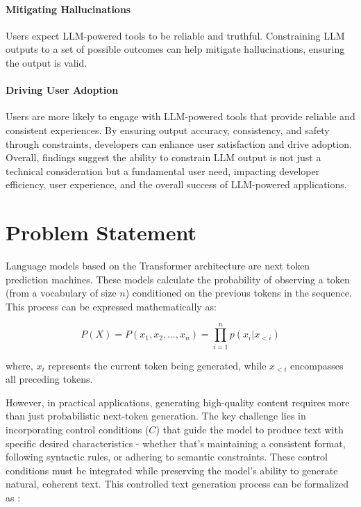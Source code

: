 \paragraph{Mitigating Hallucinations}
Users expect LLM-powered tools to be reliable and truthful. Constraining LLM outputs to a set of possible outcomes can help mitigate hallucinations, ensuring the output is valid.

\paragraph{Driving User Adoption}
Users are more likely to engage with LLM-powered tools that provide reliable and consistent experiences. By ensuring output accuracy, consistency, and safety through constraints, developers can enhance user satisfaction and drive adoption.
Overall, findings suggest the ability to constrain LLM output is not just a technical consideration but a fundamental user need, impacting developer efficiency, user experience, and the overall success of LLM-powered applications.

\section{Problem Statement}

Language models based on the Transformer architecture are next token prediction machines.
These models calculate the probability of observing a token (from a vocabulary of size $n$) conditioned on the previous tokens in the sequence. This process can be expressed mathematically as:

\begin{equation}
P(X) = P(x_1, x_2, \ldots, x_n) = \prod_{i=1}^n p(x_i|x_{<i})
\end{equation}

where, $x_i$ represents the current token being generated, while $x_{<i}$ encompasses all preceding tokens.

However, in practical applications, generating high-quality content requires more than just probabilistic next-token generation. The key challenge lies in incorporating control conditions ($C$) that guide the model to produce text with specific desired characteristics - whether that's maintaining a consistent format, following syntactic rules, or adhering to semantic constraints. These control conditions must be integrated while preserving the model's ability to generate natural, coherent text. This controlled text generation process can be formalized as \cite{liang2024controllabletextgenerationlarge}:

